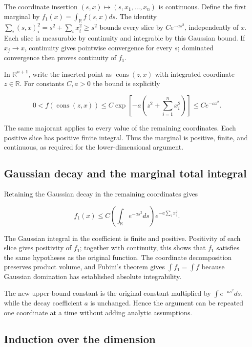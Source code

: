 \documentclass[11pt,a4paper]{article}
\begin{document}
The coordinate insertion \((s,x)\mapsto(s,x_1,\ldots,x_n)\) is continuous. Define the first marginal by \(f_1(x)=\int_\mathbb R f(s,x)ds\). The identity \(\sum_i(s,x)_i^2=s^2+\sum_i x_i^2\ge s^2\) bounds every slice by \(Ce^{-as^2}\), independently of \(x\). Each slice is measurable by continuity and integrable by this Gaussian bound. If \(x_j\to x\), continuity gives pointwise convergence for every \(s\); dominated convergence then proves continuity of \(f_1\).



In \(\mathbb R^{n+1}\), write the inserted point as \(\operatorname{cons}(z,x)\) with integrated coordinate \(z\in\mathbb R\). For constants \(C,a>0\) the bound is explicitly

\[0<f(\operatorname{cons}(z,x))\le C\exp\!\left[-a\left(z^2+\sum_{i=1}^{n}x_i^2\right)\right]\le C e^{-az^2}.\]

The same majorant applies to every value of the remaining coordinates. Each positive slice has positive finite integral. Thus the marginal is positive, finite, and continuous, as required for the lower-dimensional argument.





\subsection{\texorpdfstring{Gaussian decay and the marginal total integral}{Gaussian decay and the marginal total integral}}


Retaining the Gaussian decay in the remaining coordinates gives

\[f_1(x)\le C\left(\int_\mathbb R e^{-as^2}ds\right)e^{-a\sum_i x_i^2}.\]

The Gaussian integral in the coefficient is finite and positive. Positivity of each slice gives positivity of \(f_1\); together with continuity, this shows that \(f_1\) satisfies the same hypotheses as the original function. The coordinate decomposition preserves product volume, and Fubini’s theorem gives \(\int f_1=\int f\) because Gaussian domination has established absolute integrability.



The new upper-bound constant is the original constant multiplied by \(\int e^{-as^2}ds\), while the decay coefficient \(a\) is unchanged. Hence the argument can be repeated one coordinate at a time without adding analytic assumptions.


\subsection{\texorpdfstring{Induction over the dimension}{Induction over the dimension}}
\end{document}
